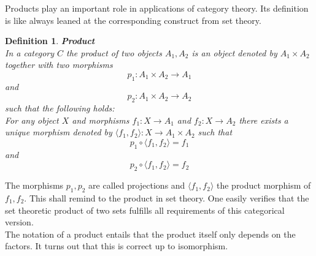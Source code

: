 \documentclass[17pt]{extarticle}
\newtheorem{definition}{Definition}
\begin{document}
	Products play an important role in applications of category theory. Its definition is like always leaned at the 
	corresponding construct from set theory.
\begin{definition}
	\textbf{Product}\\
	In a category $C$ the product of two objects $A_1, A_2$ is an object
	denoted by $A_1\times A_2$ together with two morphisms
	$$p_1:A_1\times A_2\rightarrow A_1$$
	and
	$$p_2:A_1\times A_2\rightarrow A_2$$
	such that the following holds:\\
	For any object $X$ and morphisms $f_1:X\rightarrow A_1$ and $f_2:X\rightarrow A_2$ there exists a unique morphism denoted by $\langle f_1,f_2\rangle:X\rightarrow A_1\times A_2$ such that
	$$
	p_1\circ\langle f_1,f_2\rangle=f_1
	$$
	and
	$$
	p_2\circ\langle f_1,f_2\rangle=f_2
	$$
\end{definition}
The morphisms $p_1, p_2$ are called projections and $\langle f_1, f_2\rangle$ the product morphism of $f_1, f_2$. This shall remind to the product in set theory. One easily verifies that the set theoretic product of two sets fulfills all requirements of this categorical version.\\
The notation of a product entails that the product itself only depends on the factors. It turns out that this is correct up to isomorphism.
\end{document}
